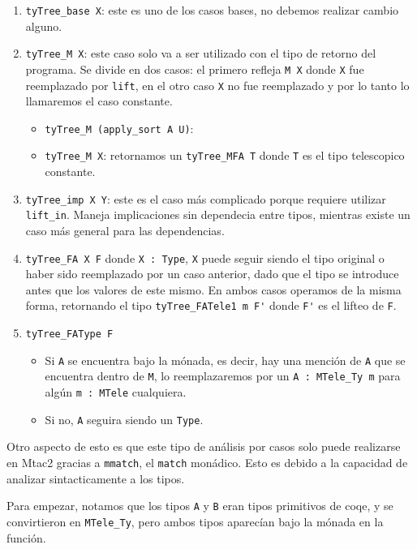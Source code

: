 \begin{enumerate}
\item \lstinline{tyTree_base X}: este es uno de los casos bases, no debemos realizar
  cambio alguno.
\item \lstinline{tyTree_M X}: este caso solo va a ser utilizado con el tipo de
  retorno del programa. Se divide en dos casos: el primero refleja \lstinline{M X}
  donde \lstinline{X} fue reemplazado por \lstinline{lift}, en el otro caso \lstinline{X} no
  fue reemplazado y por lo tanto lo llamaremos el caso constante.
  \begin{itemize}
  \item \lstinline{tyTree_M (apply_sort A U)}: 
  \item \lstinline{tyTree_M X}: retornamos un \lstinline{tyTree_MFA T} donde \lstinline{T} es
    el tipo telescopico constante.
  \end{itemize}
\item \lstinline{tyTree_imp X Y}: este es el caso más complicado porque requiere utilizar
  \lstinline{lift_in}. Maneja implicaciones sin dependecia entre tipos, mientras
  existe un caso más general para las dependencias.
\item \lstinline{tyTree_FA X F} donde \lstinline{X : Type}, \lstinline{X} puede seguir siendo el
  tipo original o haber sido reemplazado por un caso anterior, dado que el tipo
  se introduce antes que los valores de este mismo. En ambos casos operamos de
  la misma forma, retornando el tipo \lstinline{tyTree_FATele1 m F'} donde \lstinline{F'}
  es el lifteo de \lstinline{F}.
\item \lstinline{tyTree_FAType F}
  \begin{itemize}
  \item Si \lstinline{A} se encuentra bajo la mónada, es decir, hay una mención de
    \lstinline{A} que se encuentra dentro de \lstinline{M}, lo reemplazaremos por un
    \lstinline{A : MTele_Ty m} para algún \lstinline{m : MTele} cualquiera.
  \item Si no, \lstinline{A} seguira siendo un \lstinline{Type}.
  \end{itemize}
\end{enumerate}

Otro aspecto de esto es que este tipo de análisis por casos solo puede
realizarse en Mtac2 gracias a \lstinline{mmatch}, el \lstinline{match} monádico. Esto es
debido a la capacidad de analizar sintacticamente a los tipos.

Para empezar, notamos que los tipos \lstinline{A} y \lstinline{B} eran tipos primitivos de
coqe, y se convirtieron en \lstinline{MTele_Ty}, pero ambos tipos aparecían bajo la
mónada en la función.